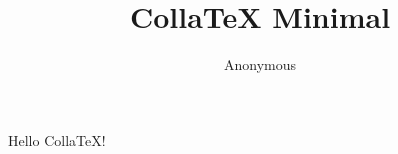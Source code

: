 \documentclass{article}
\title{CollaTeX Minimal}
\author{Anonymous}
\date{}
\begin{document}
\maketitle
Hello CollaTeX!
\end{document}
